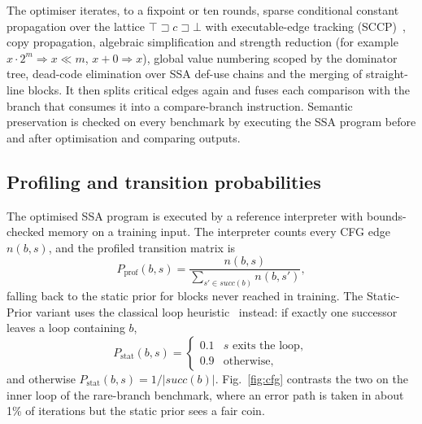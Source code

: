 \documentclass[conference]{IEEEtran}
\begin{document}
The optimiser iterates, to a fixpoint or ten rounds, sparse conditional
constant propagation over the lattice
$\top \sqsupset c \sqsupset \bot$ with executable-edge tracking
(SCCP)~\cite{wegman1991sccp}, copy propagation, algebraic simplification
and strength reduction (for example $x\cdot 2^m\Rightarrow x\ll m$,
$x+0\Rightarrow x$), global value numbering scoped by the dominator
tree, dead-code elimination over SSA def-use chains and the merging of
straight-line blocks. It then splits critical edges again and fuses
each comparison with the branch that consumes it into a compare-branch
instruction. Semantic preservation is checked on every benchmark by
executing the SSA program before and after optimisation and comparing
outputs.

\subsection{Profiling and transition probabilities}

The optimised SSA program is executed by a reference interpreter with
bounds-checked memory on a training input. The interpreter counts every
CFG edge $n(b,s)$, and the profiled transition matrix is
\begin{equation}
P_{\mathrm{prof}}(b,s)=\frac{n(b,s)}{\sum_{s'\in\mathit{succ}(b)} n(b,s')},
\label{eq:pprof}
\end{equation}
falling back to the static prior for blocks never reached in training.
The Static-Prior variant uses the classical loop heuristic~\cite{wu1994}
instead: if exactly one successor leaves a loop containing $b$,
\begin{equation}
P_{\mathrm{stat}}(b,s)=\begin{cases}
0.1 & s \text{ exits the loop},\\
0.9 & \text{otherwise},
\end{cases}
\label{eq:pstat}
\end{equation}
and otherwise $P_{\mathrm{stat}}(b,s)=1/|\mathit{succ}(b)|$.
Fig.~\ref{fig:cfg} contrasts the two on the inner loop of the
rare-branch benchmark, where an error path is taken in about 1\% of
iterations but the static prior sees a fair coin.
\end{document}
